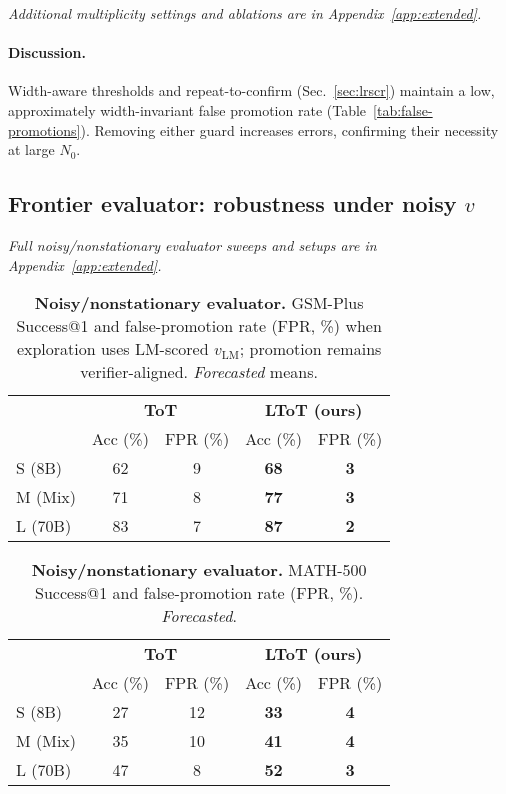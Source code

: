 \documentclass{article}
\begin{document}
\noindent\textit{Additional multiplicity settings and ablations are in Appendix~\ref{app:extended}.}
\paragraph{Discussion.}
Width-aware thresholds and repeat-to-confirm (Sec.~\ref{sec:lrscr}) maintain a low, approximately width-invariant false promotion rate (Table~\ref{tab:false-promotions}).
Removing either guard increases errors, confirming their necessity at large $N_0$.



\subsection{Frontier evaluator: robustness under noisy $v$}
\label{subsec:frontier-results-noisy}

\noindent\textit{Full noisy/nonstationary evaluator sweeps and setups are in Appendix~\ref{app:extended}.}
\begin{table}[t]
\centering
\caption{\textbf{Noisy/nonstationary evaluator.} GSM-Plus Success@1 and false-promotion rate (FPR, \%) when exploration uses LM-scored $v_{\text{LM}}$; promotion remains verifier-aligned. \emph{Forecasted} means.}
\vspace{0.3em}
\begin{tabular}{lcccc}
\toprule
 & \multicolumn{2}{c}{\textbf{ToT}} & \multicolumn{2}{c}{\textbf{LToT (ours)}} \\
\cmidrule(lr){2-3}\cmidrule(lr){4-5}
 & Acc (\%) & FPR (\%) & Acc (\%) & FPR (\%) \\
\midrule
S (8B)  & 62 & 9  & \textbf{68} & \textbf{3} \\
M (Mix) & 71 & 8  & \textbf{77} & \textbf{3} \\
L (70B) & 83 & 7  & \textbf{87} & \textbf{2} \\
\bottomrule
\end{tabular}
\label{tab:noisy-gsm}
\end{table}

\begin{table}[t]
\centering
\caption{\textbf{Noisy/nonstationary evaluator.} MATH-500 Success@1 and false-promotion rate (FPR, \%). \emph{Forecasted}.}
\vspace{0.3em}
\begin{tabular}{lcccc}
\toprule
 & \multicolumn{2}{c}{\textbf{ToT}} & \multicolumn{2}{c}{\textbf{LToT (ours)}} \\
\cmidrule(lr){2-3}\cmidrule(lr){4-5}
 & Acc (\%) & FPR (\%) & Acc (\%) & FPR (\%) \\
\midrule
S (8B)  & 27 & 12 & \textbf{33} & \textbf{4} \\
M (Mix) & 35 & 10 & \textbf{41} & \textbf{4} \\
L (70B) & 47 &  8 & \textbf{52} & \textbf{3} \\
\bottomrule
\end{tabular}
\label{tab:noisy-math}
\end{table}
\end{document}
